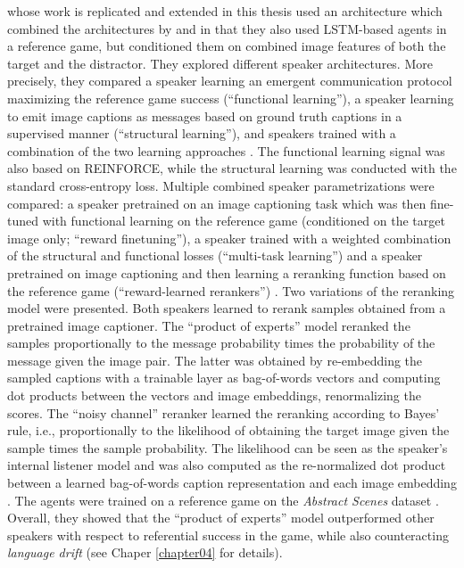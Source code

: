 \cite{lazaridou2020multi} whose work is replicated and extended in this thesis used an architecture which combined the architectures by \cite{lazaridou2016multi} and \cite{havrylov2017emergence} in that they also used LSTM-based agents in a reference game, but conditioned them on combined image features of both the target and the distractor. They explored different speaker architectures. More precisely, they compared a speaker learning an emergent communication protocol maximizing the reference game success (``functional learning''), a speaker learning to emit image captions as messages based on ground truth captions in a supervised manner (``structural learning''), and speakers trained with a combination of the two learning approaches \parencite[][p.~4]{lazaridou2020multi}. The functional learning signal was also based on REINFORCE, while the structural learning was conducted with the standard cross-entropy loss. Multiple combined speaker parametrizations were compared: a speaker pretrained on an image captioning task which was then fine-tuned with functional learning on the reference game (conditioned on the target image only; ``reward finetuning''), a speaker trained with a weighted combination of the structural and functional losses (``multi-task learning'') and a speaker pretrained on image captioning and then learning a reranking function based on the reference game (``reward-learned rerankers'') \parencite[][p.~4--5]{lazaridou2020multi}. Two variations of the reranking model were presented. Both speakers learned to rerank samples obtained from a pretrained image captioner. The ``product of experts'' model reranked the samples proportionally to the message probability times the probability of the message given the image pair. The latter was obtained by re-embedding the sampled captions with a trainable layer as bag-of-words vectors and computing dot products between the vectors and image embeddings, renormalizing the scores.  The ``noisy channel'' reranker learned the reranking according to Bayes' rule, i.e., proportionally to the likelihood of obtaining the target image given the sample times the sample probability. The likelihood can be seen as the speaker's internal listener model and was also computed as the re-normalized dot product between a learned bag-of-words caption representation and each image embedding \parencite[][p.~5--6]{lazaridou2020multi}. The agents were trained on a reference game on the \textit{Abstract Scenes} dataset \parencite{zitnick2013bringing}.
Overall, they showed that the ``product of experts'' model outperformed other speakers with respect to referential success in the game, while also counteracting \textit{language drift} (see Chaper \ref{chapter04} for details). 

